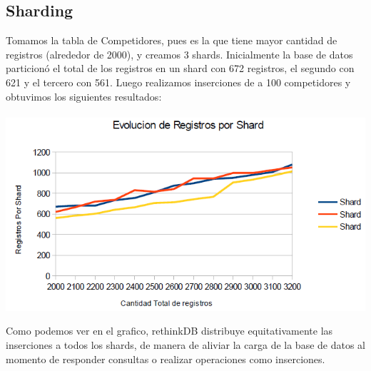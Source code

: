\subsection{Sharding}

Tomamos la tabla de Competidores, pues es la que tiene mayor cantidad de 
registros (alrededor de 2000), y creamos 3 shards. Inicialmente la base 
de datos particion\'o el total de los registros en un shard con 672 
registros, el segundo con 621 y el tercero con 561. Luego realizamos 
inserciones de a 100 competidores y obtuvimos los siguientes resultados: \\ \\

\includegraphics[scale=0.75]{Shards.png}

Como podemos ver en el grafico, rethinkDB distribuye equitativamente las 
inserciones a todos los shards, de manera de aliviar la carga de la base 
de datos al momento de responder consultas o realizar operaciones 
como inserciones.

